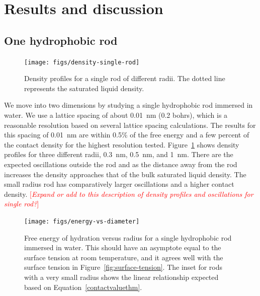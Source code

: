\documentclass[letterpaper,twocolumn,amsmath,amssymb,prb]{revtex4-1}
\newcommand{\needsworknow}[1]{\textcolor{red}{[\emph{#1}]}}
\begin{document}
\section{Results and discussion}

\subsection{One hydrophobic rod}

\begin{figure}
\begin{center}
\texttt{[image: figs/density-single-rod]}
\end{center}
\caption{ Density profiles for a single rod of different radii. The dotted line
represents the saturated liquid density.  }
\label{fig:density-single-rod}
\end{figure}

We move into two dimensions by studying a single hydrophobic rod
immersed in water. We use a lattice spacing of about 0.01~nm (0.2 bohrs), 
which is a reasonable resolution based on several lattice spacing calculations.
The results for this spacing of 0.01~nm are within 0.5\% of the free energy 
and a few percent of the contact
density for the highest resolution tested.
Figure~\ref{fig:density-single-rod} shows density
profiles for three different radii, 0.3~nm, 0.5~nm, and 1~nm. There are the
expected oscillations outside the rod and as the distance away from the rod
increases
the density approaches that of the bulk saturated liquid density. The small
radius
rod has comparatively larger oscillations and a higher contact density.
\needsworknow{Expand or add to this description of density profiles and
oscillations for single rod?}

\begin{figure}
\begin{center}
\texttt{[image: figs/energy-vs-diameter]}
\end{center}
\caption{ Free energy of hydration versus radius for a single hydrophobic rod
immersed in water. This should have an asymptote equal to the surface
tension at room temperature, and it agrees well with the surface tension in
Figure~\ref{fig:surface-tension}. The inset for rods with a very small 
radius shows the linear relationship expected based on 
Equation~\ref{contactvaluethm}.}
\label{fig:energy-vs-diameter}
\end{figure}
\end{document}

